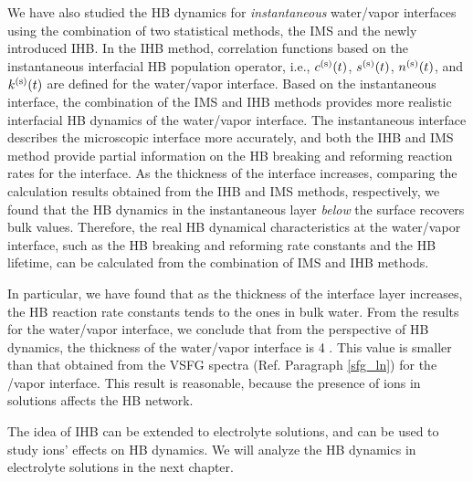 We have also studied the HB dynamics for \emph{instantaneous} water/vapor interfaces using the combination 
of two statistical methods, the IMS and the newly introduced IHB.
In the IHB method, correlation functions based on the instantaneous interfacial HB population operator, 
i.e., $c^{(\text s)}(t)$, $s^{(\text s)}(t)$, $n^{(\text s)}(t)$, and $k^{(\text s)}(t)$ are defined for the water/vapor interface.
Based on the instantaneous interface, the combination of the IMS and
IHB methods provides more realistic interfacial HB dynamics of the water/vapor interface.  
The instantaneous interface describes the microscopic interface more accurately, 
and both the IHB and IMS method provide partial information on the HB breaking and reforming reaction rates for the interface. 
As the thickness of the interface increases, comparing the calculation results obtained from the IHB and IMS methods, respectively, 
we found that the HB dynamics in the instantaneous layer \emph{below} the surface recovers bulk values. 
Therefore, the real HB dynamical characteristics at the water/vapor interface, such as the HB breaking and reforming rate constants and the HB lifetime, 
can be calculated from the combination of IMS and IHB methods. 

In particular, we have found that as the thickness of the interface layer increases, 
the HB reaction rate constants tends to the ones in bulk water.
From the results for the water/vapor interface, we conclude that from the perspective of HB dynamics,
the thickness of the water/vapor interface is 4 \A. This value is smaller than that obtained from the VSFG spectra 
(Ref. Paragraph \thinspace\ref{sfg_ln}) for the \LiN/vapor interface. 
This result is reasonable, because the presence of ions in solutions affects the HB network. 

The idea of IHB can be extended to electrolyte solutions, and can be used to study ions' effects on HB dynamics.
We will analyze the HB dynamics in electrolyte solutions in the next chapter.


